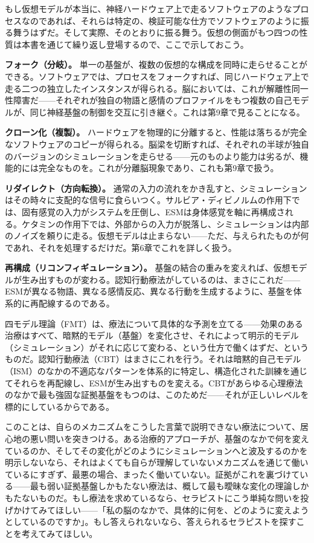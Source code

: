 \documentclass[11pt, twoside, openright]{book}
\begin{document}
もし仮想モデルが本当に、神経ハードウェア上で走るソフトウェアのようなプロセスなのであれば、それらは特定の、検証可能な仕方でソフトウェアのように振る舞うはずだ。そして実際、そのとおりに振る舞う。仮想の側面がもつ四つの性質は本書を通じて繰り返し登場するので、ここで示しておこう。

\textbf{フォーク（分岐）。} 単一の基盤が、複数の仮想的な構成を同時に走らせることができる。ソフトウェアでは、プロセスをフォークすれば、同じハードウェア上で走る二つの独立したインスタンスが得られる。脳においては、これが解離性同一性障害だ------それぞれが独自の物語と感情のプロファイルをもつ複数の自己モデルが、同じ神経基盤の制御を交互に引き継ぐ。これは第9章で見ることになる。

\textbf{クローン化（複製）。} ハードウェアを物理的に分離すると、性能は落ちるが完全なソフトウェアのコピーが得られる。脳梁を切断すれば、それぞれの半球が独自のバージョンのシミュレーションを走らせる------元のものより能力は劣るが、機能的には完全なものを。これが分離脳現象であり、これも第9章で扱う。

\textbf{リダイレクト（方向転換）。} 通常の入力の流れをかき乱すと、シミュレーションはその時々に支配的な信号に食らいつく。サルビア・ディビノルムの作用下では、固有感覚の入力がシステムを圧倒し、ESMは身体感覚を軸に再構成される。ケタミンの作用下では、外部からの入力が脱落し、シミュレーションは内部のノイズを頼りに走る。仮想モデルは止まらない------ただ、与えられたものが何であれ、それを処理するだけだ。第6章でこれを詳しく扱う。

\textbf{再構成（リコンフィギュレーション）。} 基盤の結合の重みを変えれば、仮想モデルが生み出すものが変わる。認知行動療法がしているのは、まさにこれだ------ESMが異なる物語、異なる感情反応、異なる行動を生成するように、基盤を体系的に再配線するのである。

四モデル理論（FMT）は、療法について具体的な予測を立てる------効果のある治療はすべて、暗黙的モデル（基盤）を変化させ、それによって明示的モデル（シミュレーション）がそれに応じて変わる、という仕方で働くはずだ、というものだ。認知行動療法（CBT）はまさにこれを行う。それは暗黙的自己モデル（ISM）のなかの不適応なパターンを体系的に特定し、構造化された訓練を通じてそれらを再配線し、ESMが生み出すものを変える。CBTがあらゆる心理療法のなかで最も強固な証拠基盤をもつのは、このためだ------それが正しいレベルを標的にしているからである。

このことは、自らのメカニズムをこうした言葉で説明できない療法について、居心地の悪い問いを突きつける。ある治療的アプローチが、基盤のなかで何を変えているのか、そしてその変化がどのようにシミュレーションへと波及するのかを明示しないなら、それはよくても自らが理解していないメカニズムを通じて働いているにすぎず、最悪の場合、まったく働いていない。証拠がこれを裏づけている------最も弱い証拠基盤しかもたない療法は、概して最も曖昧な変化の理論しかもたないものだ。もし療法を求めているなら、セラピストにこう単純な問いを投げかけてみてほしい------「私の脳のなかで、具体的に何を、どのように変えようとしているのですか」。もし答えられないなら、答えられるセラピストを探すことを考えてみてほしい。
\end{document}
